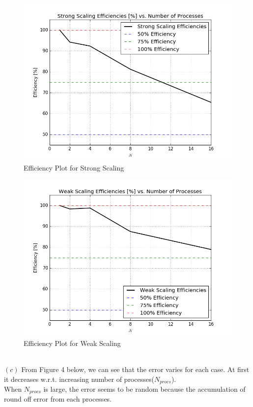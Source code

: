 \documentclass[12pt]{article}
\newenvironment{problem}[2][Problem]{\begin{trivlist}
\item[\hskip \labelsep {\bfseries #1}\hskip \labelsep {\bfseries #2.}]}{\end{trivlist}}
\begin{document}
\begin{problem}{1}
\begin{figure}[H]
\centering
  \includegraphics[scale=0.55]{part_b_strong.png}
 \caption{Efficiency Plot for Strong Scaling}
\label{label}
\end{figure}
\begin{figure}[H]
\centering
  \includegraphics[scale=0.55]{part_b_weak.png}
 \caption{Efficiency Plot for Weak Scaling}
\label{label}
\end{figure}
\text{}\\
$(c)$ From Figure 4 below, we can see that the error varies for each case. At first it decreases w.r.t. increasing number of processes($N_{procs}$).\\
When $N_{procs}$ is large, the error seems to be random because the accumulation of round off error from each processes.\\

\end{problem}
\end{document}
